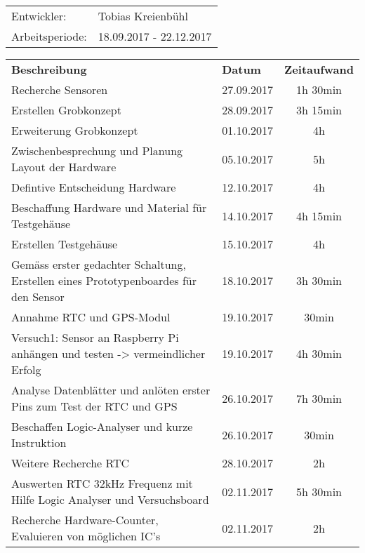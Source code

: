     \begin{tabular}{ll}
        Entwickler: & Tobias Kreienbühl \\
        Arbeitsperiode: & 18.09.2017 - 22.12.2017\\
    \end{tabular}

	\begin{longtable}{p{9cm}|p{2cm}|c}
		\header
		\textbf{Beschreibung} 	& \textbf{Datum} 	& \textbf{Zeitaufwand}\\
		Recherche Sensoren 		& 27.09.2017 		& 1h 30min\\\midrule
            Erstellen Grobkonzept 	& 28.09.2017 		& 3h 15min\\\midrule
            Erweiterung Grobkonzept & 01.10.2017 		& 4h\\\midrule
            Zwischenbesprechung und Planung Layout der Hardware	& 05.10.2017	& 5h\\\midrule
            Defintive Entscheidung Hardware		& 12.10.2017 & 4h\\\midrule
            Beschaffung Hardware und Material für Testgehäuse  & 14.10.2017 & 4h 15min \\\midrule
		Erstellen Testgehäuse  & 15.10.2017 & 4h\\\midrule
		Gemäss erster gedachter Schaltung, Erstellen eines Prototypenboardes für den Sensor & 18.10.2017 & 3h 30min\\ \midrule
		Annahme RTC und GPS-Modul & 19.10.2017 & 30min \\\midrule
		Versuch1: Sensor an Raspberry Pi anhängen und testen -> vermeindlicher Erfolg & 19.10.2017 & 4h 30min \\ \midrule
		Analyse Datenblätter und anlöten erster Pins zum Test der RTC und GPS & 26.10.2017 & 7h 30min\\ \midrule
		Beschaffen Logic-Analyser und kurze Instruktion & 26.10.2017 & 30min \\\midrule
		Weitere Recherche RTC & 28.10.2017 & 2h \\\midrule
		Auswerten RTC 32kHz Frequenz mit Hilfe Logic Analyser und Versuchsboard & 02.11.2017 & 5h 30min \\\midrule
		Recherche Hardware-Counter, Evaluieren von möglichen IC's & 02.11.2017 & 2h\\ \midrule

\end{longtable}
